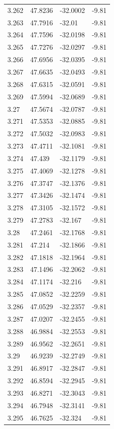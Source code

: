 \begin{tabular}{llll}
3.262 & 47.8236 & -32.0002 & -9.81 \\
3.263 & 47.7916 & -32.01 & -9.81 \\
3.264 & 47.7596 & -32.0198 & -9.81 \\
3.265 & 47.7276 & -32.0297 & -9.81 \\
3.266 & 47.6956 & -32.0395 & -9.81 \\
3.267 & 47.6635 & -32.0493 & -9.81 \\
3.268 & 47.6315 & -32.0591 & -9.81 \\
3.269 & 47.5994 & -32.0689 & -9.81 \\
3.27 & 47.5674 & -32.0787 & -9.81 \\
3.271 & 47.5353 & -32.0885 & -9.81 \\
3.272 & 47.5032 & -32.0983 & -9.81 \\
3.273 & 47.4711 & -32.1081 & -9.81 \\
3.274 & 47.439 & -32.1179 & -9.81 \\
3.275 & 47.4069 & -32.1278 & -9.81 \\
3.276 & 47.3747 & -32.1376 & -9.81 \\
3.277 & 47.3426 & -32.1474 & -9.81 \\
3.278 & 47.3105 & -32.1572 & -9.81 \\
3.279 & 47.2783 & -32.167 & -9.81 \\
3.28 & 47.2461 & -32.1768 & -9.81 \\
3.281 & 47.214 & -32.1866 & -9.81 \\
3.282 & 47.1818 & -32.1964 & -9.81 \\
3.283 & 47.1496 & -32.2062 & -9.81 \\
3.284 & 47.1174 & -32.216 & -9.81 \\
3.285 & 47.0852 & -32.2259 & -9.81 \\
3.286 & 47.0529 & -32.2357 & -9.81 \\
3.287 & 47.0207 & -32.2455 & -9.81 \\
3.288 & 46.9884 & -32.2553 & -9.81 \\
3.289 & 46.9562 & -32.2651 & -9.81 \\
3.29 & 46.9239 & -32.2749 & -9.81 \\
3.291 & 46.8917 & -32.2847 & -9.81 \\
3.292 & 46.8594 & -32.2945 & -9.81 \\
3.293 & 46.8271 & -32.3043 & -9.81 \\
3.294 & 46.7948 & -32.3141 & -9.81 \\
3.295 & 46.7625 & -32.324 & -9.81 \\

\end{tabular}
